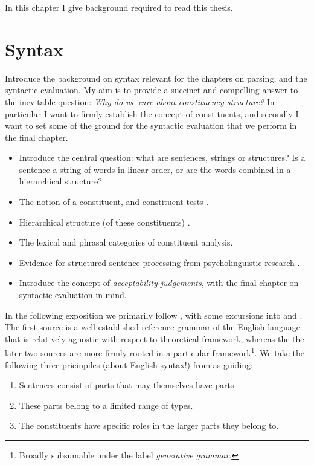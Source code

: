 

In this chapter I give background required to read this thesis.

\section{Syntax}
Introduce the background on syntax relevant for the chapters on parsing, and the syntactic evaluation. My aim is to provide a succinct and compelling answer to the inevitable question: \textit{Why do we care about constituency structure?} In particular I want to firmly establish the concept of constituents, and secondly I want to set some of the ground for the syntactic evaluation that we perform in the final chapter.
\begin{itemize}
  \item Introduce the central question: what are sentences, strings or structures? Is a sentence a string of words in linear order, or are the words combined in a hierarchical structure? \citep{Everaert+2015:structures,Frank+2012:hierarchical}
  \item The notion of a constituent, and constituent tests \citet{carnie2010constituent,huddleston2002grammar}.
  \item Hierarchical structure (of these constituents) \citet{Everaert+2015:structures}.
  \item The lexical and phrasal categories of constituent analysis.
  \item Evidence for structured sentence processing from psycholinguistic research \citep{hale2001earley,levy2008expectation,brennan2016abstract}.
  \item Introduce the concept of \textit{acceptability judgements}, with the final chapter on syntactic evaluation in mind.
\end{itemize}

In the following exposition we primarily follow \citet{huddleston2002grammar}, with some excursions into \citet{carnie2010constituent} and \citet{Everaert+2015:structures}. The first source is a well established reference grammar of the English language that is relatively agnostic with respect to theoretical framework, whereas the the later two sources are more firmly rooted in a particular framework\footnote{Broadly subsumable under the label \textit{generative grammar}.}. We take the following three pricinpiles (about English syntax!) from \citep{huddleston2002grammar} as guiding:
\begin{enumerate}[label=(\roman*)]
  \item Sentences consist of parts that may themselves have parts.
  \item These parts belong to a limited range of types.
  \item The constituents have specific roles in the larger parts they belong to.
\end{enumerate}

